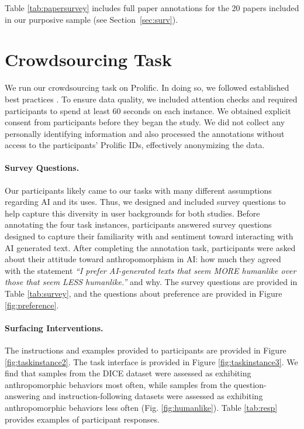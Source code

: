 \documentclass[11pt]{article}
\begin{document}
Table \ref{tab:papersurvey} includes full paper annotations for the 20 papers included in our purposive sample (see Section~\ref{sec:surv}).

\section{Crowdsourcing Task}\label{sec:prolific}

We run our crowdsourcing task on Prolific. In doing so, we followed established best practices \cite{Converse1986-bw,Fowler1995-bz}. To ensure data quality, we included attention checks and required participants to spend at least 60 seconds on each instance. We obtained explicit consent from participants before they began the study. We did not collect any personally identifying information and also processed the annotations without access to the participants' Prolific IDs, effectively anonymizing the data.

\paragraph{Survey Questions.} Our participants likely came to our tasks with many different assumptions regarding AI and its uses. Thus, we designed and included survey questions to help capture this diversity in user backgrounds for both studies. Before annotating the four task instances, participants answered survey questions designed to capture their familiarity with and sentiment toward interacting with AI generated text. After completing the annotation task, participants were asked about their attitude toward anthropomorphism in AI: how much they agreed with the statement \textit{``I prefer AI-generated texts that seem MORE humanlike over those that seem LESS humanlike.''} and why. The survey questions are provided in Table \ref{tab:survey}, and the questions about preference are provided in Figure \ref{fig:preference}. 

\paragraph{Surfacing Interventions.}
The instructions and examples provided to participants are provided in Figure \ref{fig:taskinstance2}.
The task interface is provided in Figure \ref{fig:taskinstance3}. We find that samples from the DICE dataset were assessed as exhibiting anthropomorphic behaviors most often, while samples from the question-answering and instruction-following datasets were assessed as exhibiting anthropomorphic behaviors less often (Fig. \ref{fig:humanlike}).  Table \ref{tab:resp} provides examples of participant responses.
\end{document}
